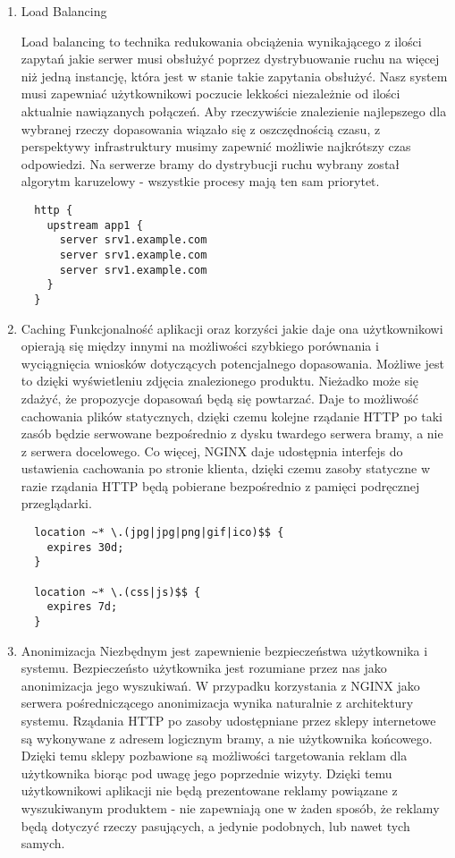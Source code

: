 \documentclass[12pt]{article}
\begin{document}
\begin{enumerate}
\item Load Balancing

Load balancing to technika redukowania obciążenia wynikającego z ilości zapytań jakie serwer musi obsłużyć poprzez dystrybuowanie ruchu na więcej niż jedną instancję, która jest w stanie takie zapytania obsłużyć. Nasz system musi zapewniać użytkownikowi poczucie lekkości niezależnie od ilości aktualnie nawiązanych połączeń. Aby rzeczywiście znalezienie najlepszego dla wybranej rzeczy dopasowania wiązało się z oszczędnością czasu, z perspektywy infrastruktury musimy zapewnić możliwie najkrótszy czas odpowiedzi.
Na serwerze bramy do dystrybucji ruchu wybrany został algorytm karuzelowy - wszystkie procesy mają ten sam priorytet.
\begin{lstlisting}
  http {
    upstream app1 {
      server srv1.example.com
      server srv1.example.com
      server srv1.example.com
    }
  }
\end{lstlisting}

\item{Caching}
Funkcjonalność aplikacji oraz korzyści jakie daje ona użytkownikowi opierają się między innymi na możliwości szybkiego porównania i wyciągnięcia wniosków dotyczących potencjalnego dopasowania. Możliwe jest to dzięki wyświetleniu zdjęcia znalezionego produktu. Nieżadko może się zdażyć, że propozycje dopasowań będą się powtarzać. Daje to możliwość cachowania plików statycznych, dzięki czemu kolejne rządanie HTTP po taki zasób będzie serwowane bezpośrednio z dysku twardego serwera bramy, a nie z serwera docelowego.
Co więcej, NGINX daje udostępnia interfejs do ustawienia cachowania po stronie klienta, dzięki czemu zasoby statyczne w razie rządania HTTP będą pobierane bezpośrednio z pamięci podręcznej przeglądarki.

\begin{lstlisting}
  location ~* \.(jpg|jpg|png|gif|ico)$$ {
    expires 30d;
  }
  
  location ~* \.(css|js)$$ {
    expires 7d;
  }
\end{lstlisting}

\item{Anonimizacja}
Niezbędnym jest zapewnienie bezpieczeństwa użytkownika i systemu.
Bezpieczeństo użytkownika jest rozumiane przez nas jako anonimizacja jego wyszukiwań. W przypadku korzystania z NGINX jako serwera pośredniczącego anonimizacja wynika naturalnie z architektury systemu.
Rządania HTTP po zasoby udostępniane przez sklepy internetowe są wykonywane z adresem logicznym bramy, a nie użytkownika końcowego.
Dzięki temu sklepy pozbawione są możliwości targetowania reklam dla użytkownika  biorąc pod uwagę jego poprzednie wizyty. Dzięki temu użytkownikowi aplikacji nie będą prezentowane reklamy powiązane z wyszukiwanym produktem - nie zapewniają one w żaden sposób, że reklamy będą dotyczyć rzeczy pasujących, a jedynie podobnych, lub nawet tych samych.


\end{enumerate}
\end{document}
